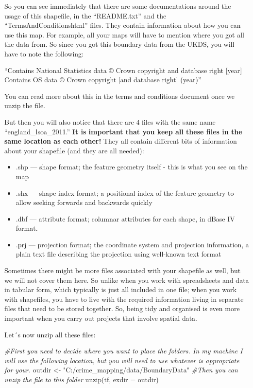 \documentclass[
]{book}
\newenvironment{Shaded}{\begin{snugshade}}{\end{snugshade}}
\newcommand{\AttributeTok}[1]{\textcolor[rgb]{0.77,0.63,0.00}{#1}}
\newcommand{\CommentTok}[1]{\textcolor[rgb]{0.56,0.35,0.01}{\textit{#1}}}
\newcommand{\FunctionTok}[1]{\textcolor[rgb]{0.00,0.00,0.00}{#1}}
\newcommand{\NormalTok}[1]{#1}
\newcommand{\OtherTok}[1]{\textcolor[rgb]{0.56,0.35,0.01}{#1}}
\newcommand{\StringTok}[1]{\textcolor[rgb]{0.31,0.60,0.02}{#1}}
\providecommand{\tightlist}{%
  \setlength{\itemsep}{0pt}\setlength{\parskip}{0pt}}
\begin{document}
So you can see immediately that there are some documentations around the usage of this shapefile, in the ``README.txt'' and the ``TermsAndConditionshtml'' files. They contain information about how you can use this map. For example, all your maps will have to mention where you got all the data from. So since you got this boundary data from the UKDS, you will have to note the following:

``Contains National Statistics data © Crown copyright and database right {[}year{]}
Contains OS data © Crown copyright {[}and database right{]} (year)''

You can read more about this in the terms and conditions document once we unzip the file.

But then you will also notice that there are 4 files with the same name ``england\_lsoa\_2011.'' \textbf{It is important that you keep all these files in the same location as each other!} They all contain different bits of information about your shapefile (and they are all needed):

\begin{itemize}
\tightlist
\item
  .shp --- shape format; the feature geometry itself - this is what you see on the map
\item
  .shx --- shape index format; a positional index of the feature geometry to allow seeking forwards and backwards quickly
\item
  .dbf --- attribute format; columnar attributes for each shape, in dBase IV format.
\item
  .prj --- projection format; the coordinate system and projection information, a plain text file describing the projection using well-known text format
\end{itemize}

Sometimes there might be more files associated with your shapefile as well, but we will not cover them here. So unlike when you work with spreadsheets and data in tabular form, which typically is just all included in one file; when you work with shapefiles, you have to live with the required information living in separate files that need to be stored together. So, being tidy and organised is even more important when you carry out projects that involve spatial data.

Let´s now unzip all these files:

\begin{Shaded}
\begin{Highlighting}[]
\CommentTok{\#First you need to decide where you want to place the folders. In my machine I will use the following location, but you will need to use whatever is appropriate for your.}
\NormalTok{outdir }\OtherTok{\textless{}{-}} \StringTok{"C:/crime\_mapping/data/BoundaryData"}
\CommentTok{\#Then you can unzip the file to this folder}
\FunctionTok{unzip}\NormalTok{(tf, }\AttributeTok{exdir =}\NormalTok{ outdir)}
\end{Highlighting}
\end{Shaded}
\end{document}
